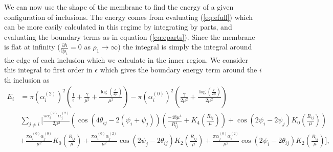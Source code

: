 We can now use the shape of the membrane to find the energy of a given configuration of inclusions. The energy comes from evaluating (\ref{eq:efull}) which can be more easily calculated in this regime by integrating by parts, and evaluating the boundary terms as in equation (\ref{eq:eparts}). Since the membrane is flat at infinity ($\frac{\partial h}{\partial \rho_1} = 0$ as $\rho_1 \rightarrow \infty$) the integral is simply the integral around the edge of each inclusion which we calculate in the inner region. We consider this integral to first order in $\epsilon$ which gives the boundary energy term around the $i$th inclusion as
\begin{equation}
\begin{split}
    E_i &= \pi\left(\alpha_i^{(2)}\right)^2\left(\frac{1}{\epsilon} + \frac{\gamma}{\mu^2} + \frac{\log(\frac{\epsilon}{2\mu})}{\mu^2}\right) - \pi\left(\alpha_i^{(0)}\right)^2\left(\frac{\gamma}{2\mu^2} + \frac{\log(\frac{\epsilon}{2\mu})}{2\mu^2}\right) \\
    &\sum_{j\neq i}\Bigg[\frac{\pi \alpha_i^{(2)}\alpha_j^{(2)}}{2\mu^2}\left(\cos\left(4\theta_{ij}-2(\psi_i+\psi_j)\right)\left(\frac{-48\mu^4}{R_{ij}^4} + K_4\left(\frac{R_{ij}}{\mu}\right)\right) + \cos\left(2\psi_i-2\psi_j\right)K_0\left(\frac{R_{ij}}{\mu}\right)\right) \\
    &+ \frac{\pi  \alpha_i^{(0)} \alpha_j^{(0)}}{\mu ^2} K_0\left(\frac{R_{ij}}{\mu }\right) + \frac{\pi  \alpha_i^{(0)} \alpha_j^{(2)}}{\mu ^2} \cos (2\psi_j-2\theta_{ij}) K_2\left(\frac{R_{ij}}{\mu }\right) + \frac{\pi  \alpha_j^{(0)} \alpha_i^{(2)}}{\mu ^2} \cos (2\psi_i-2\theta_{ij}) K_2\left(\frac{R_{ij}}{\mu }\right)\Bigg],
    \end{split}
    \label{eq:E_inc_boundary}
\end{equation}
